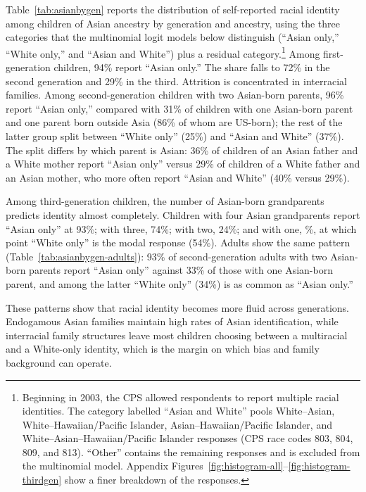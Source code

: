 Table~\ref{tab:asianbygen} reports the distribution of self-reported racial identity among children of Asian ancestry by generation and ancestry, using the three categories that the multinomial logit models below distinguish (``Asian only,'' ``White only,'' and ``Asian and White'') plus a residual category.\footnote{Beginning in 2003, the CPS allowed respondents to report multiple racial identities. The category labelled ``Asian and White'' pools White--Asian, White--Hawaiian/Pacific Islander, Asian--Hawaiian/Pacific Islander, and White--Asian--Hawaiian/Pacific Islander responses (CPS race codes 803, 804, 809, and 813). ``Other'' contains the remaining responses and is excluded from the multinomial model. Appendix Figures~\ref{fig:histogram-all}--\ref{fig:histogram-thirdgen} show a finer breakdown of the responses.} Among first-generation children, 94\% report ``Asian only.'' The share falls to 72\% in the second generation and 29\% in the third. Attrition is concentrated in interracial families. Among second-generation children with two Asian-born parents, 96\% report ``Asian only,'' compared with 31\% of children with one Asian-born parent and one parent born outside Asia (86\% of whom are US-born); the rest of the latter group split between ``White only'' (25\%) and ``Asian and White'' (37\%). The split differs by which parent is Asian: 36\% of children of an Asian father and a White mother report ``Asian only'' versus 29\% of children of a White father and an Asian mother, who more often report ``Asian and White'' (40\% versus 29\%).

Among third-generation children, the number of Asian-born grandparents predicts identity almost completely. Children with four Asian grandparents report ``Asian only'' at 93\%; with three, 74\%; with two, 24\%; and with one, \%, at which point ``White only'' is the modal response (54\%). Adults show the same pattern (Table~\ref{tab:asianbygen-adults}): 93\% of second-generation adults with two Asian-born parents report ``Asian only'' against 33\% of those with one Asian-born parent, and among the latter ``White only'' (34\%) is as common as ``Asian only.''

These patterns show that racial identity becomes more fluid across generations. Endogamous Asian families maintain high rates of Asian identification, while interracial family structures leave most children choosing between a multiracial and a White-only identity, which is the margin on which bias and family background can operate.


